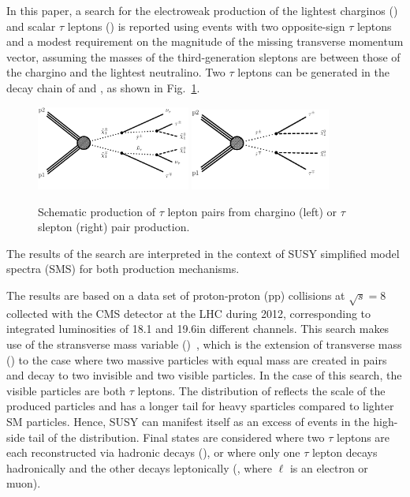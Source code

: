 In this paper, a search for the electroweak production of the lightest charginos (\PSGcpmDo) and scalar $\tau$  leptons (\PSGt) is reported using events
with two opposite-sign $\tau$ leptons and
a modest requirement on the magnitude of the missing transverse  momentum vector,  
assuming the masses of the third-generation sleptons are between those of the
chargino and the lightest neutralino.
Two $\tau$ leptons can be generated in the decay chain of \PSGcpmDo and \PSGt, as shown in Fig.~\ref{fig:Productions}.
\begin{figure}[!htb]
\centering
\includegraphics[width=0.45\textwidth]{Figure_001-a.pdf}
\includegraphics[width=0.41\textwidth]{Figure_001-b.pdf}
\caption{Schematic production of $\tau$ lepton pairs from chargino (left) or $\tau$ slepton (right) pair production.}
\label{fig:Productions}
\end{figure}
The results of the search are interpreted in the context of SUSY simplified model spectra (SMS) \cite{Alwall:2008ag,alves:sms} for both
production mechanisms.


The results are based on a data set of proton-proton (pp)
collisions at $\sqrt{s} = 8$\TeV
collected with the CMS detector at the LHC during 2012, corresponding to integrated
luminosities of 18.1 and 19.6\fbinv in different channels.
This search makes use of the stransverse mass variable (\mttwo)~\cite{Lester:1999tx,Barr:2003rg},
which is the extension of transverse mass (\mt) to the case
where two massive particles with equal mass are created in pairs
and decay to two invisible and two visible particles.
In the case of this search, the visible particles are both $\tau$ leptons.
The distribution of \mttwo reflects the scale of the produced particles and has a longer tail for heavy sparticles
compared to lighter SM particles. Hence, SUSY
can manifest itself
as an excess of events in the high-side tail of the \mttwo distribution.
Final states are considered where
two $\tau$ leptons are each reconstructed via hadronic decays (\tauTau),
or where only one $\tau$ lepton  decays hadronically and
the other decays leptonically (\leptonTau, where $\ell$ is an electron or muon).

